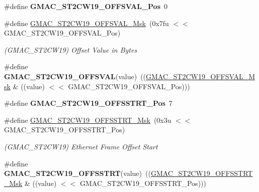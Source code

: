 \begin{DoxyCompactItemize}
\item 
\mbox{\label{group__SAME70__GMAC_ga6157100413566972a68e4fd8d4bb3bb5}} 
\#define {\bfseries G\+M\+A\+C\+\_\+\+S\+T2\+C\+W19\+\_\+\+O\+F\+F\+S\+V\+A\+L\+\_\+\+Pos}~0
\item 
\mbox{\label{group__SAME70__GMAC_ga225165898a62c677b2926748ba4d7b1b}} 
\#define \mbox{\hyperlink{group__SAME70__GMAC_ga225165898a62c677b2926748ba4d7b1b}{G\+M\+A\+C\+\_\+\+S\+T2\+C\+W19\+\_\+\+O\+F\+F\+S\+V\+A\+L\+\_\+\+Msk}}~(0x7fu $<$$<$ G\+M\+A\+C\+\_\+\+S\+T2\+C\+W19\+\_\+\+O\+F\+F\+S\+V\+A\+L\+\_\+\+Pos)
\begin{DoxyCompactList}\small\item\em (G\+M\+A\+C\+\_\+\+S\+T2\+C\+W19) Offset Value in Bytes \end{DoxyCompactList}\item 
\mbox{\label{group__SAME70__GMAC_gad4aae9ea059049158ee5e6ffe68fb4af}} 
\#define {\bfseries G\+M\+A\+C\+\_\+\+S\+T2\+C\+W19\+\_\+\+O\+F\+F\+S\+V\+AL}(value)~((\mbox{\hyperlink{group__SAMV71__GMAC_ga225165898a62c677b2926748ba4d7b1b}{G\+M\+A\+C\+\_\+\+S\+T2\+C\+W19\+\_\+\+O\+F\+F\+S\+V\+A\+L\+\_\+\+Msk}} \& ((value) $<$$<$ G\+M\+A\+C\+\_\+\+S\+T2\+C\+W19\+\_\+\+O\+F\+F\+S\+V\+A\+L\+\_\+\+Pos)))
\item 
\mbox{\label{group__SAME70__GMAC_gacfc728f1299f5b7145192e01fe45a1dc}} 
\#define {\bfseries G\+M\+A\+C\+\_\+\+S\+T2\+C\+W19\+\_\+\+O\+F\+F\+S\+S\+T\+R\+T\+\_\+\+Pos}~7
\item 
\mbox{\label{group__SAME70__GMAC_ga8bae782e134660557cbfc059f8817cf4}} 
\#define \mbox{\hyperlink{group__SAME70__GMAC_ga8bae782e134660557cbfc059f8817cf4}{G\+M\+A\+C\+\_\+\+S\+T2\+C\+W19\+\_\+\+O\+F\+F\+S\+S\+T\+R\+T\+\_\+\+Msk}}~(0x3u $<$$<$ G\+M\+A\+C\+\_\+\+S\+T2\+C\+W19\+\_\+\+O\+F\+F\+S\+S\+T\+R\+T\+\_\+\+Pos)
\begin{DoxyCompactList}\small\item\em (G\+M\+A\+C\+\_\+\+S\+T2\+C\+W19) Ethernet Frame Offset Start \end{DoxyCompactList}\item 
\mbox{\label{group__SAME70__GMAC_ga73fc866519ba97540fceed2fd638eae0}} 
\#define {\bfseries G\+M\+A\+C\+\_\+\+S\+T2\+C\+W19\+\_\+\+O\+F\+F\+S\+S\+T\+RT}(value)~((\mbox{\hyperlink{group__SAMV71__GMAC_ga8bae782e134660557cbfc059f8817cf4}{G\+M\+A\+C\+\_\+\+S\+T2\+C\+W19\+\_\+\+O\+F\+F\+S\+S\+T\+R\+T\+\_\+\+Msk}} \& ((value) $<$$<$ G\+M\+A\+C\+\_\+\+S\+T2\+C\+W19\+\_\+\+O\+F\+F\+S\+S\+T\+R\+T\+\_\+\+Pos)))

\end{DoxyCompactItemize}
